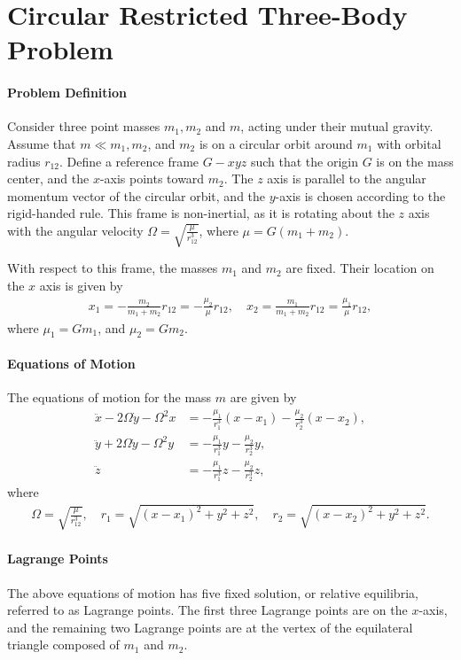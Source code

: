 \documentclass[10pt]{article}
\date{}
\theoremstyle{plain}\theorembodyfont{\normalfont}
\begin{document}
\pagestyle{empty}
\section*{Circular Restricted Three-Body Problem}

\paragraph{Problem Definition}

Consider three point masses $m_1,m_2$ and $m$, acting under their mutual gravity. Assume that $m \ll m_1,m_2$, and $m_2$ is on a circular orbit around $m_1$ with orbital radius $r_{12}$. Define a reference frame $G-xyz$ such that the origin $G$ is on the mass center, and the $x$-axis points toward $m_2$. The $z$ axis is parallel to the angular momentum vector of the circular orbit, and the $y$-axis is chosen according to the rigid-handed rule. This frame is non-inertial, as it is rotating about the $z$ axis with the angular velocity $\Omega=\sqrt{\frac{\mu}{r_{12}^3}}$, where $\mu=G(m_1+m_2)$.

With respect to this frame, the masses $m_1$ and $m_2$ are fixed. Their location on the $x$ axis is given by
\begin{align*}
x_1 = -\frac{m_2}{m_1+m_2} r_{12} = -\frac{\mu_2}{\mu} r_{12},\quad 
x_2 = \frac{m_1}{m_1+m_2} r_{12} = \frac{\mu_1}{\mu} r_{12},
\end{align*}
where $\mu_1 = Gm_1$, and $\mu_2=Gm_2$.

\paragraph*{Equations of Motion} The equations of motion for the mass $m$ are given by
\begin{align}
\ddot x - 2\Omega \dot y -\Omega^2x & = -\frac{\mu_1}{r_1^3} (x-x_1)-\frac{\mu_2}{r_2^3} (x-x_2),\\
\ddot y + 2\Omega \dot y -\Omega^2y & = -\frac{\mu_1}{r_1^3} y-\frac{\mu_2}{r_2^3}y,\\
\ddot z & = -\frac{\mu_1}{r_1^3} z-\frac{\mu_2}{r_2^3}z,
\end{align}
where
\begin{align*}
\Omega=\sqrt{\frac{\mu}{r_{12}^3}},\quad r_1=\sqrt{(x-x_1)^2+y^2+z^2},\quad r_2=\sqrt{(x-x_2)^2+y^2+z^2}.
\end{align*}

\paragraph*{Lagrange Points} The above equations of motion has five fixed solution, or relative equilibria, referred to as Lagrange points. The first three Lagrange points are on the $x$-axis, and the remaining two Lagrange points are at the vertex of the equilateral triangle composed of $m_1$ and $m_2$.
\end{document}
